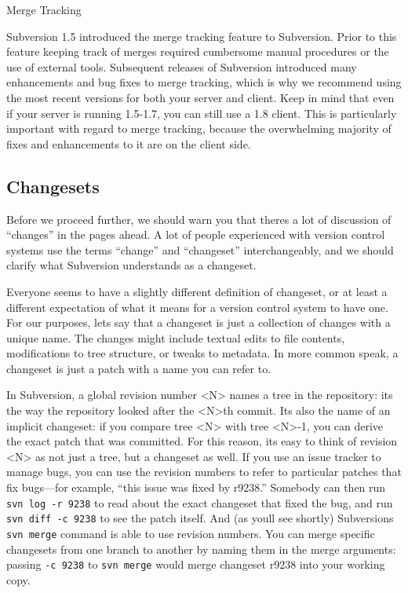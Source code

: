 \protect{}\label{svn.branchmerge.basicmerging.mergetracking}
Merge Tracking

Subversion 1.5 introduced the merge tracking feature to Subversion.
Prior to this feature keeping track of merges required cumbersome manual
procedures or the use of external tools. Subsequent releases of
Subversion introduced many enhancements and bug fixes to merge tracking,
which is why we recommend using the most recent versions for both your
server and client. Keep in mind that even if your server is running
1.5-1.7, you can still use a 1.8 client. This is particularly important
with regard to merge tracking, because the overwhelming majority of
fixes and enhancements to it are on the client side.

\subsection{Changesets}\label{svn.branchmerge.changesets}

Before we proceed further, we should warn you that
there\textquotesingle s a lot of discussion of ``changes'' in the pages
ahead. A lot of people experienced with version control systems use the
terms ``change'' and ``changeset'' interchangeably, and we should
clarify what Subversion understands as a changeset.

Everyone seems to have a slightly different definition of changeset, or
at least a different expectation of what it means for a version control
system to have one. For our purposes, let\textquotesingle s say that a
changeset is just a collection of changes with a unique name. The
changes might include textual edits to file contents, modifications to
tree structure, or tweaks to metadata. In more common speak, a changeset
is just a patch with a name you can refer to.

In Subversion, a global revision number \textless N\textgreater{} names
a tree in the repository: it\textquotesingle s the way the repository
looked after the \textless N\textgreater th commit. It\textquotesingle s
also the name of an implicit changeset: if you compare tree
\textless N\textgreater{} with tree \textless N\textgreater-1, you can
derive the exact patch that was committed. For this reason,
it\textquotesingle s easy to think of revision \textless N\textgreater{}
as not just a tree, but a changeset as well. If you use an issue tracker
to manage bugs, you can use the revision numbers to refer to particular
patches that fix bugs---for example, ``this issue was fixed by r9238.''
Somebody can then run \texttt{svn\ log\ -r\ 9238} to read about the
exact changeset that fixed the bug, and run \texttt{svn\ diff\ -c\ 9238}
to see the patch itself. And (as you\textquotesingle ll see shortly)
Subversion\textquotesingle s \texttt{svn\ merge} command is able to use
revision numbers. You can merge specific changesets from one branch to
another by naming them in the merge arguments: passing \texttt{-c\ 9238}
to \texttt{svn\ merge} would merge changeset r9238 into your working
copy.


